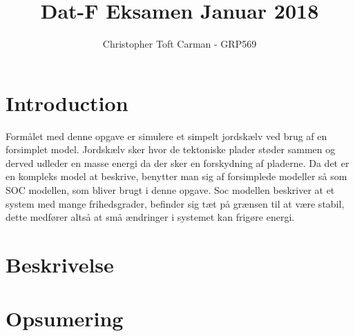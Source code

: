 \documentclass[10pt]{article}
\title{Dat-F Eksamen Januar 2018}
\author{Christopher Toft Carman - GRP569}
\date{}
\begin{document}
\maketitle
\newpage

\section{Introduction} %
\label{sec:introduction}
Formålet med denne opgave er simulere et simpelt jordskælv ved brug af en forsimplet model. 
Jordskælv sker hvor de tektoniske plader støder sammen og derved udleder en masse energi da der sker en forskydning af pladerne. 
Da det er en kompleks model at beskrive, benytter man sig af forsimplede modeller så som SOC modellen, som bliver brugt i denne opgave.
Soc modellen beskriver at et system med mange frihedsgrader, befinder sig tæt på grænsen til at være stabil, dette medfører altså at små ændringer i systemet kan frigøre energi. 




\section{Beskrivelse} %
\label{sec:beskrivelse}

\section{Opsumering} %
\label{sec:}
\end{document}
